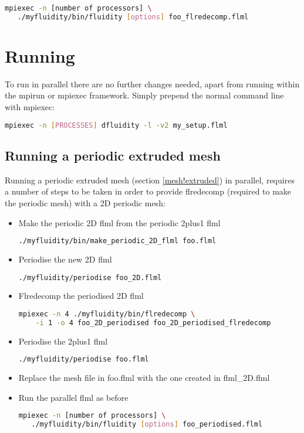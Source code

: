 \begin{lstlisting}[language=bash]
mpiexec -n [number of processors] \
   ./myfluidity/bin/fluidity [options] foo_flredecomp.flml
\end{lstlisting}

\section{Running}

To run in parallel there are no further changes needed, apart from running \fluidity
within the mpirun or mpiexec framework. Simply prepend the normal command line with mpiexec:
\begin{lstlisting}[language=bash]
mpiexec -n [PROCESSES] dfluidity -l -v2 my_setup.flml
\end{lstlisting}

\subsection{Running a periodic extruded mesh}

Running a periodic extruded mesh (section \ref{mesh!extruded}) in parallel, requires a number of steps to be taken in order to provide flredecomp (required to make the periodic mesh) with a 2D periodic mesh:

\begin{itemize}
\item Make the periodic 2D flml from the periodic 2plus1 flml
\begin{lstlisting}[language=bash]
 ./myfluidity/bin/make_periodic_2D_flml foo.flml
\end{lstlisting}
\item Periodise the new 2D flml
\begin{lstlisting}[language=bash]
 ./myfluidity/periodise foo_2D.flml
\end{lstlisting}
\item Flredecomp the periodised 2D flml
\begin{lstlisting}[language=bash]
mpiexec -n 4 ./myfluidity/bin/flredecomp \
    -i 1 -o 4 foo_2D_periodised foo_2D_periodised_flredecomp
\end{lstlisting}
\item Periodise the 2plus1 flml
\begin{lstlisting}[language=bash]
 ./myfluidity/periodise foo.flml
\end{lstlisting}
\item Replace the mesh file in foo.flml with the one created in flml\_2D.flml
\item Run the parallel flml as before
\begin{lstlisting}[language=bash]
mpiexec -n [number of processors] \
   ./myfluidity/bin/fluidity [options] foo_periodised.flml
\end{lstlisting}
\end{itemize}

